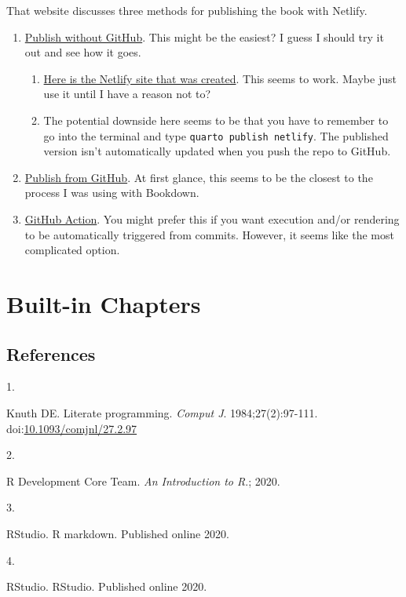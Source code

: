 \documentclass[
  letterpaper,
  DIV=11,
  numbers=noendperiod]{scrreprt}
\newlength{\cslhangindent}
\newlength{\csllabelwidth}
\newenvironment{CSLReferences}[2] %
 {\begin{list}{}{%
  \setlength{\itemindent}{0pt}
  \setlength{\leftmargin}{0pt}
  \setlength{\parsep}{0pt}
  \ifodd #1
   \setlength{\leftmargin}{\cslhangindent}
   \setlength{\itemindent}{-1\cslhangindent}
  \fi
  \setlength{\itemsep}{#2\baselineskip}}}
 {\end{list}}
\newcommand{\CSLLeftMargin}[1]{\parbox[t]{\csllabelwidth}{\strut#1\strut}}
\newcommand{\CSLRightInline}[1]{\parbox[t]{\linewidth - \csllabelwidth}{\strut#1\strut}}
\begin{document}
That website discusses three methods for publishing the book with
Netlify.

\begin{enumerate}
\def\labelenumi{\arabic{enumi}.}
\item
  \href{https://quarto.org/docs/publishing/netlify.html\#publish-command}{Publish
  without GitHub}. This might be the easiest? I guess I should try it
  out and see how it goes.

  \begin{enumerate}
  \def\labelenumii{\alph{enumii}.}
  \item
    \href{https://brad-cannell-test-quarto-book.netlify.app/}{Here is
    the Netlify site that was created}. This seems to work. Maybe just
    use it until I have a reason not to?
  \item
    The potential downside here seems to be that you have to remember to
    go into the terminal and type \texttt{quarto\ publish\ netlify}. The
    published version isn't automatically updated when you push the repo
    to GitHub.
  \end{enumerate}
\item
  \href{https://quarto.org/docs/publishing/netlify.html\#publish-from-git-provider}{Publish
  from GitHub}. At first glance, this seems to be the closest to the
  process I was using with Bookdown.
\item
  \href{https://quarto.org/docs/publishing/netlify.html\#github-action}{GitHub
  Action}. You might prefer this if you want execution and/or rendering
  to be automatically triggered from commits. However, it seems like the
  most complicated option.
\end{enumerate}

\part{Built-in Chapters}

\chapter*{References}\label{references}


\label{refs}
\begin{CSLReferences}{0}{1}
\CSLLeftMargin{1. }%
\CSLRightInline{Knuth DE. Literate programming. \emph{Comput J}.
1984;27(2):97-111.
doi:\href{https://doi.org/10.1093/comjnl/27.2.97}{10.1093/comjnl/27.2.97}}

\CSLLeftMargin{2. }%
\CSLRightInline{R Development Core Team. \emph{An Introduction to {R}}.;
2020.}

\CSLLeftMargin{3. }%
\CSLRightInline{RStudio. {R} markdown. Published online 2020.}

\CSLLeftMargin{4. }%
\CSLRightInline{RStudio. {RStudio}. Published online 2020.}

\end{CSLReferences}
\end{document}
